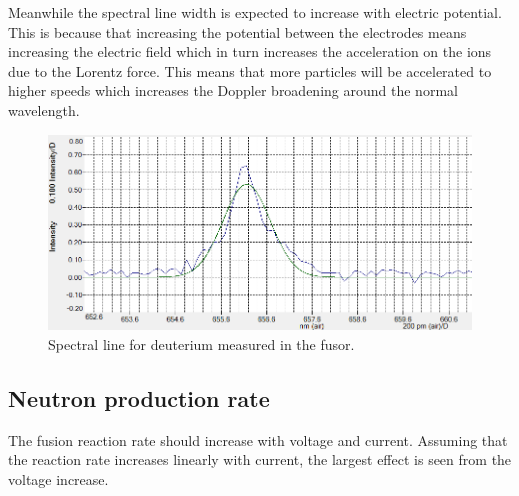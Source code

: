Meanwhile the spectral line width is expected to increase with electric potential. This is because that increasing the potential between the electrodes means increasing the electric field which in turn increases the acceleration on the ions due to the Lorentz force. This means that more particles will be accelerated to higher speeds which increases the Doppler broadening around the normal wavelength.
\begin{figure}[ht!]
	\centering
	\includegraphics[width=\textwidth]{Figures/D_linje.png}
	\caption{Spectral line for deuterium measured in the fusor.}
	\label{fig:Spectro}
\end{figure}
\subsection{Neutron production rate}
The fusion reaction rate should increase with voltage and current. Assuming that the reaction rate increases linearly with current, the largest effect is seen from the voltage increase.
